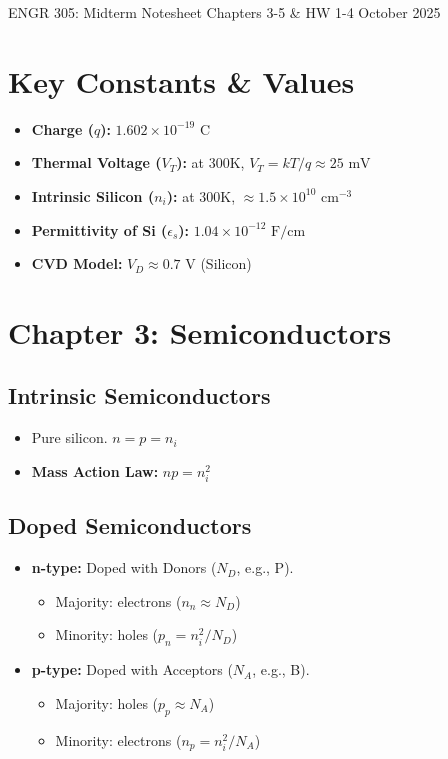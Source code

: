 \documentclass[10pt]{article}
\begin{document}
ENGR 305: Midterm Notesheet \hfill Chapters 3-5 \& HW 1-4 \hfill October 2025

\begin{multicols}{3}
\section*{Key Constants \& Values}
\begin{itemize}\itemsep0pt
    \item \textbf{Charge ($q$):} $1.602 \times 10^{-19} \text{ C}$
    \item \textbf{Thermal Voltage ($V_T$):} at 300K, $V_T = kT/q \approx 25 \text{ mV}$
    \item \textbf{Intrinsic Silicon ($n_i$):} at 300K, $\approx 1.5 \times 10^{10} \text{ cm}^{-3}$
    \item \textbf{Permittivity of Si ($\epsilon_s$):} $1.04 \times 10^{-12} \text{ F/cm}$
    \item \textbf{CVD Model:} $V_D \approx 0.7 \text{ V}$ (Silicon)
\end{itemize}

\section{Chapter 3: Semiconductors}

\subsection*{Intrinsic Semiconductors}
\begin{itemize}\itemsep0pt
    \item Pure silicon. $n = p = n_i$
    \item \textbf{Mass Action Law:} $np = n_i^2$
\end{itemize}

\subsection*{Doped Semiconductors}
\begin{itemize}\itemsep0pt
    \item \textbf{n-type:} Doped with Donors ($N_D$, e.g., P).
    \begin{itemize}\itemsep0pt
        \item Majority: electrons ($n_n \approx N_D$)
        \item Minority: holes ($p_n = n_i^2 / N_D$)
    \end{itemize}
    \item \textbf{p-type:} Doped with Acceptors ($N_A$, e.g., B).
    \begin{itemize}\itemsep0pt
        \item Majority: holes ($p_p \approx N_A$)
        \item Minority: electrons ($n_p = n_i^2 / N_A$)
    \end{itemize}
\end{itemize}


\end{multicols}
\end{document}

